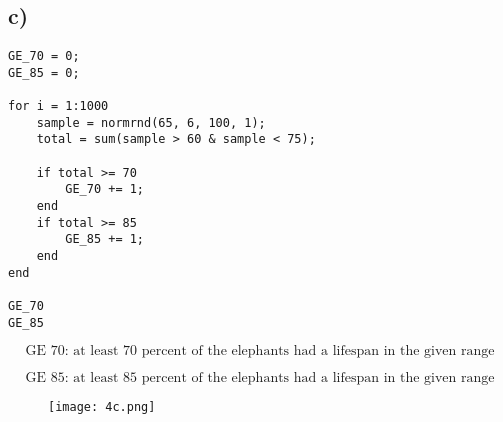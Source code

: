 \documentclass[12pt]{article}
\begin{document}
\subsection*{c)} 



\begin{lstlisting}
GE_70 = 0;
GE_85 = 0;

for i = 1:1000		
    sample = normrnd(65, 6, 100, 1);
    total = sum(sample > 60 & sample < 75);	
    
    if total >= 70
        GE_70 += 1;
    end
    if total >= 85
        GE_85 += 1;
    end
end

GE_70
GE_85

\end{lstlisting}

\[ \text{ GE 70: at least 70 percent of the elephants had a lifespan in the given range } \]

\[ \text{ GE 85: at least 85 percent of the elephants had a lifespan in the given range } \]

\begin{figure}
  \texttt{[image: 4c.png]}
  \label{4c}
\end{figure}
\end{document}
